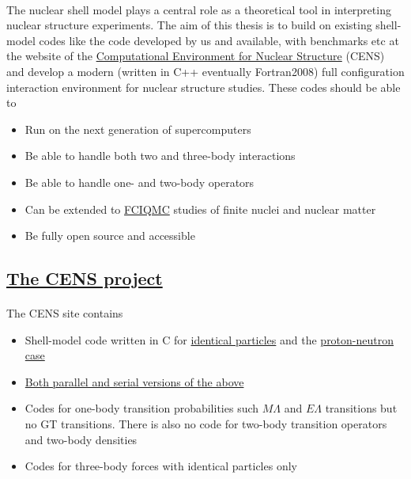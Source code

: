 \documentclass[%
oneside,                 %
final,                   %
10pt]{article}
\begin{document}
\paragraph{}
The nuclear shell model 
plays a central role as a theoretical tool in interpreting nuclear
structure experiments. The aim of this thesis is to build on existing
shell-model codes like the code developed by us and available, with
benchmarks etc at the website of the \href{{https://github.com/ManyBodyPhysics/CENS}}{Computational Environment for
Nuclear Structure} (CENS)
and develop a modern (written in C++ eventually Fortran2008) full
configuration interaction environment for nuclear structure
studies. These codes should be able to 
\begin{itemize}
\item Run on the next generation of supercomputers 

\item Be able to handle both two and three-body interactions 

\item Be able to handle one- and two-body operators 

\item Can be extended to \href{{https://www.duo.uio.no/bitstream/handle/10852/37172/master.pdf?sequence=1}}{FCIQMC} studies of finite nuclei and nuclear matter

\item Be fully open source and accessible
\end{itemize}

\noindent



\subsection*{\href{{https://github.com/ManyBodyPhysics/CENS}}{The CENS project}}

\paragraph{}
The CENS  site contains 
\begin{itemize}
\item Shell-model code written in C for \href{{https://github.com/ManyBodyPhysics/CENS/tree/master/FCI/serial/IdenticalParticles}}{identical particles} and the \href{{https://github.com/ManyBodyPhysics/CENS/tree/master/FCI/serial/pnCase}}{proton-neutron case}

\item \href{{https://github.com/ManyBodyPhysics/CENS/tree/master/FCI}}{Both parallel and serial versions of the above}

\item Codes for one-body transition probabilities such $M\Lambda$ and $E\Lambda$ transitions but no GT transitions. There is also no code for two-body transition operators and two-body densities

\item Codes for three-body forces with identical particles only
\end{itemize}
\end{document}
